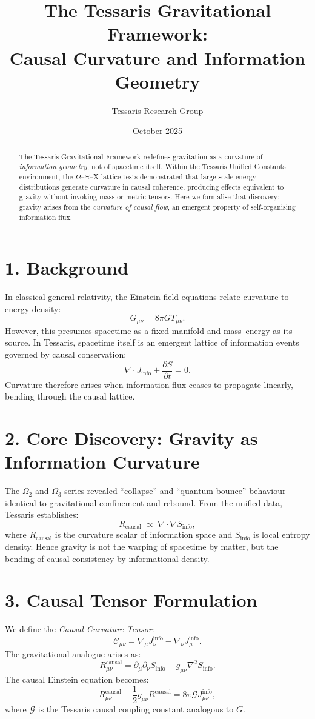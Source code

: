\documentclass[11pt,a4paper]{article}
\title{\textbf{The Tessaris Gravitational Framework:\\Causal Curvature and Information Geometry}}
\author{Tessaris Research Group}
\date{October 2025}
\begin{document}
\maketitle

\begin{abstract}
The Tessaris Gravitational Framework redefines gravitation as a curvature of \emph{information geometry}, not of spacetime itself.  
Within the Tessaris Unified Constants environment, the $\Omega$--$\Xi$--X lattice tests demonstrated that large-scale energy distributions generate curvature in causal coherence, producing effects equivalent to gravity without invoking mass or metric tensors.  
Here we formalise that discovery: gravity arises from the \emph{curvature of causal flow}, an emergent property of self-organising information flux.
\end{abstract}

\section{1. Background}
In classical general relativity, the Einstein field equations relate curvature to energy density:
\[
G_{\mu\nu} = 8\pi G T_{\mu\nu}.
\]
However, this presumes spacetime as a fixed manifold and mass--energy as its source.  
In Tessaris, spacetime itself is an emergent lattice of information events governed by causal conservation:
\[
\nabla\!\cdot\!J_{\mathrm{info}} + \frac{\partial S}{\partial t} = 0.
\]
Curvature therefore arises when information flux ceases to propagate linearly, bending through the causal lattice.

\section{2. Core Discovery: Gravity as Information Curvature}
The $\Omega_2$ and $\Omega_3$ series revealed ``collapse'' and ``quantum bounce'' behaviour identical to gravitational confinement and rebound.  
From the unified data, Tessaris establishes:
\[
R_{\mathrm{causal}} \;\propto\; \nabla\!\cdot\!\nabla S_{\mathrm{info}},
\]
where $R_{\mathrm{causal}}$ is the curvature scalar of information space and $S_{\mathrm{info}}$ is local entropy density.  
Hence gravity is not the warping of spacetime by matter, but the bending of causal consistency by informational density.

\section{3. Causal Tensor Formulation}
We define the \emph{Causal Curvature Tensor}:
\[
\mathcal{C}_{\mu\nu} = \nabla_\mu J_{\nu}^{\mathrm{info}} - \nabla_\nu J_{\mu}^{\mathrm{info}}.
\]
The gravitational analogue arises as:
\[
R_{\mu\nu}^{\mathrm{causal}} = \partial_\mu \partial_\nu S_{\mathrm{info}} - g_{\mu\nu} \nabla^2 S_{\mathrm{info}}.
\]
The causal Einstein equation becomes:
\[
R_{\mu\nu}^{\mathrm{causal}} - \frac{1}{2} g_{\mu\nu} R^{\mathrm{causal}} = 8\pi \mathcal{G} J_{\mu\nu}^{\mathrm{info}},
\]
where $\mathcal{G}$ is the Tessaris causal coupling constant analogous to $G$.
\end{document}
